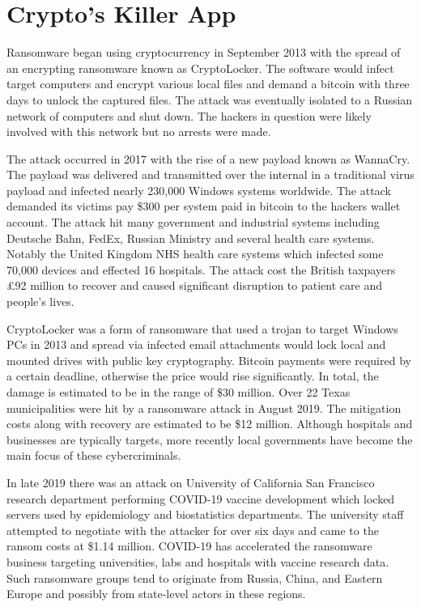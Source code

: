 \section{Crypto's Killer App}

Ransomware began using cryptocurrency in September 2013 with the spread
of an encrypting ransomware known as CryptoLocker. The software would
infect target computers and encrypt various local files and demand a
bitcoin with three days to unlock the captured files. The attack was
eventually isolated to a Russian network of computers and shut down. The
hackers in question were likely involved with this network but no
arrests were made.

The attack occurred in 2017 with the rise of a new payload known as WannaCry.
The payload was delivered and transmitted over the internal in a traditional
virus payload and infected nearly 230,000 Windows systems worldwide. The attack
demanded its victims pay \$300 per system paid in bitcoin to the hackers wallet
account. The attack hit many government and industrial systems including
Deutsche Bahn, FedEx, Russian Ministry and several health care systems. Notably
the United Kingdom NHS health care systems which infected some 70,000 devices
and effected 16 hospitals. The attack cost the British taxpayers £92 million to
recover and caused significant disruption to patient care and people's lives.
\cite{nytRansomware}

CryptoLocker was a form of ransomware that used a trojan to target Windows PCs
in 2013 and spread via infected email attachments would lock local and mounted
drives with public key cryptography. Bitcoin payments were required by a certain
deadline, otherwise the price would rise significantly. In total, the damage is
estimated to be in the range of \$30 million. Over 22 Texas municipalities were
hit by a ransomware attack in August 2019. The mitigation costs along with
recovery are estimated to be \$12 million. Although hospitals and businesses are
typically targets, more recently local governments have become the main focus
of these cybercriminals.

In late 2019 there was an attack on University of California San Francisco
research department performing COVID-19 vaccine development which locked servers
used by epidemiology and biostatistics departments. The university staff
attempted to negotiate with the attacker for over six days and came to the
ransom costs at \$1.14 million. COVID-19 has accelerated the ransomware business
targeting universities, labs and hospitals with vaccine research data. Such
ransomware groups tend to originate from Russia, China, and Eastern Europe and
possibly from state-level actors in these regions. \cite{xia2020don, mehrotra2020}

